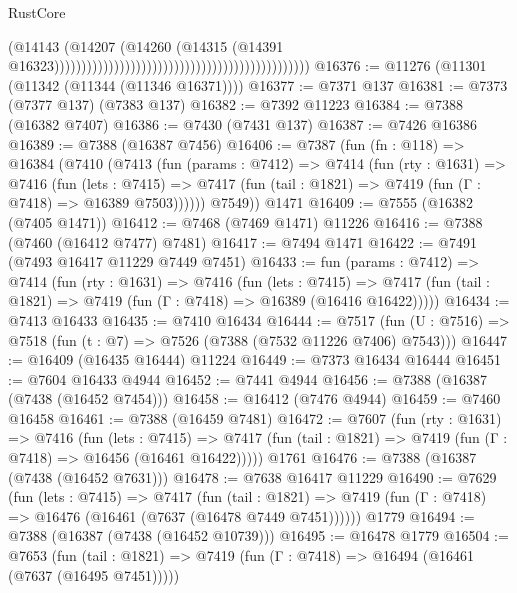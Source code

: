 \begin{lexlean}{RustCore}
\begin{coremodule}
                                                                                        (@14143
                                                                                          (@14207
                                                                                            (@14260
                                                                                              (@14315
                                                                                                (@14391
                                                                                                  @16323)))))))))))))))))))))))))))))))))))))))))))))))
@16376 := @11276 (@11301 (@11342 (@11344 (@11346 @16371))))
@16377 := @7371 @137
@16381 := @7373 (@7377 @137) (@7383 @137)
@16382 := @7392 @11223
@16384 := @7388 (@16382 @7407)
@16386 := @7430 (@7431 @137)
@16387 := @7426 @16386
@16389 := @7388 (@16387 @7456)
@16406 := @7387
    (fun (fn : @118) =>
    @16384
      (@7410
        (@7413
          (fun (params : @7412) =>
          @7414
            (fun (rty : @1631) =>
            @7416
              (fun (lets : @7415) =>
              @7417 (fun (tail : @1821) => @7419 (fun (Γ : @7418) => @16389 @7503))))))
        @7549))
    @1471
@16409 := @7555 (@16382 (@7405 @1471))
@16412 := @7468 (@7469 @1471) @11226
@16416 := @7388 (@7460 (@16412 @7477) @7481)
@16417 := @7494 @1471
@16422 := @7491 (@7493 @16417 @11229 @7449 @7451)
@16433 := fun (params : @7412) =>
  @7414
    (fun (rty : @1631) =>
    @7416
      (fun (lets : @7415) =>
      @7417 (fun (tail : @1821) => @7419 (fun (Γ : @7418) => @16389 (@16416 @16422)))))
@16434 := @7413 @16433
@16435 := @7410 @16434
@16444 := @7517
    (fun (U : @7516) => @7518 (fun (t : @7) => @7526 (@7388 (@7532 @11226 @7406) @7543)))
@16447 := @16409 (@16435 @16444) @11224
@16449 := @7373 @16434 @16444
@16451 := @7604 @16433 @4944
@16452 := @7441 @4944
@16456 := @7388 (@16387 (@7438 (@16452 @7454)))
@16458 := @16412 (@7476 @4944)
@16459 := @7460 @16458
@16461 := @7388 (@16459 @7481)
@16472 := @7607
    (fun (rty : @1631) =>
    @7416
      (fun (lets : @7415) =>
      @7417 (fun (tail : @1821) => @7419 (fun (Γ : @7418) => @16456 (@16461 @16422)))))
    @1761
@16476 := @7388 (@16387 (@7438 (@16452 @7631)))
@16478 := @7638 @16417 @11229
@16490 := @7629
    (fun (lets : @7415) =>
    @7417
      (fun (tail : @1821) =>
      @7419 (fun (Γ : @7418) => @16476 (@16461 (@7637 (@16478 @7449 @7451))))))
    @1779
@16494 := @7388 (@16387 (@7438 (@16452 @10739)))
@16495 := @16478 @1779
@16504 := @7653
    (fun (tail : @1821) => @7419 (fun (Γ : @7418) => @16494 (@16461 (@7637 (@16495 @7451)))))

\end{coremodule}
\end{lexlean}
